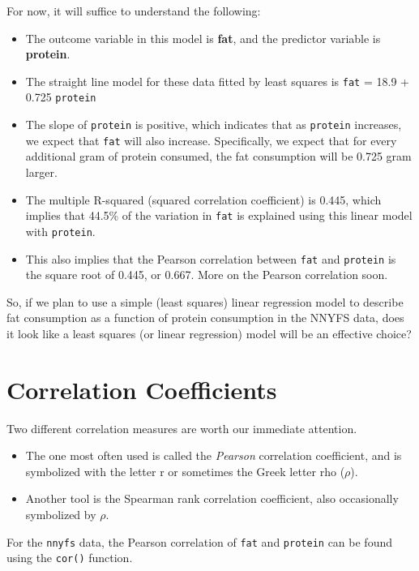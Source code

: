 \documentclass[
]{book}
\providecommand{\tightlist}{%
  \setlength{\itemsep}{0pt}\setlength{\parskip}{0pt}}
\begin{document}
For now, it will suffice to understand the following:

\begin{itemize}
\tightlist
\item
  The outcome variable in this model is \textbf{fat}, and the predictor variable is \textbf{protein}.
\item
  The straight line model for these data fitted by least squares is \texttt{fat} = 18.9 + 0.725 \texttt{protein}
\item
  The slope of \texttt{protein} is positive, which indicates that as \texttt{protein} increases, we expect that \texttt{fat} will also increase. Specifically, we expect that for every additional gram of protein consumed, the fat consumption will be 0.725 gram larger.
\item
  The multiple R-squared (squared correlation coefficient) is 0.445, which implies that 44.5\% of the variation in \texttt{fat} is explained using this linear model with \texttt{protein}.
\item
  This also implies that the Pearson correlation between \texttt{fat} and \texttt{protein} is the square root of 0.445, or 0.667. More on the Pearson correlation soon.
\end{itemize}

So, if we plan to use a simple (least squares) linear regression model to describe fat consumption as a function of protein consumption in the NNYFS data, does it look like a least squares (or linear regression) model will be an effective choice?

\hypertarget{correlation-coefficients}{%
\section{Correlation Coefficients}\label{correlation-coefficients}}

Two different correlation measures are worth our immediate attention.

\begin{itemize}
\tightlist
\item
  The one most often used is called the \emph{Pearson} correlation coefficient, and is symbolized with the letter r or sometimes the Greek letter rho (\(\rho\)).
\item
  Another tool is the Spearman rank correlation coefficient, also occasionally symbolized by \(\rho\).
\end{itemize}

For the \texttt{nnyfs} data, the Pearson correlation of \texttt{fat} and \texttt{protein} can be found using the \texttt{cor()} function.
\end{document}
